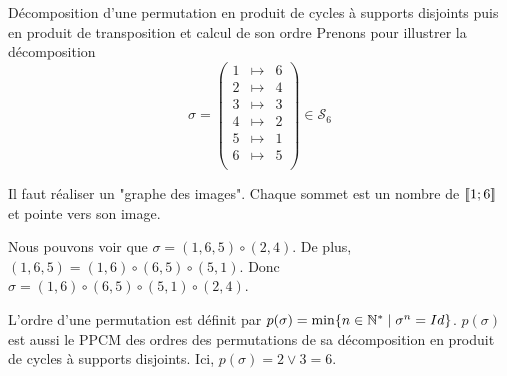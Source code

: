 \documentclass{article}
\begin{document}
\begin{question_kholle}
	{Décomposition d'une permutation en produit de cycles à supports disjoints puis en produit de transposition et calcul de son ordre}
	Prenons pour illustrer la décomposition
	\begin{equation*}
		\sigma = \begin{pmatrix}
			1 & \mapsto & 6 \\
			2 & \mapsto & 4 \\
			3 & \mapsto & 3 \\
			4 & \mapsto & 2 \\
			5 & \mapsto & 1 \\
			6 & \mapsto & 5 \\
		\end{pmatrix}
		\in \mathcal{S}_6
	\end{equation*}

	Il faut réaliser un "graphe des images". Chaque sommet est un nombre de $[\![ 1; 6 ]\!]$ et pointe vers son image.

	\begin{figure}[H]
		\centering
	\end{figure}

	Nous pouvons voir que $\sigma = (1, 6, 5) \circ (2, 4)$.
	De plus, $(1, 6, 5) = (1, 6) \circ (6, 5) \circ (5, 1)$.
	Donc $\sigma = (1, 6) \circ (6, 5) \circ (5, 1) \circ (2, 4)$.

	L'ordre d'une permutation est définit par $p(\sigma) = \min \{ n \in \mathbb N^* \;|\; \sigma^n = Id \}$. $p(\sigma)$ est aussi le PPCM des ordres des permutations de sa décomposition en produit de cycles à supports disjoints. Ici, $p(\sigma) = 2 \vee 3 = 6$.
\end{question_kholle}
\end{document}
